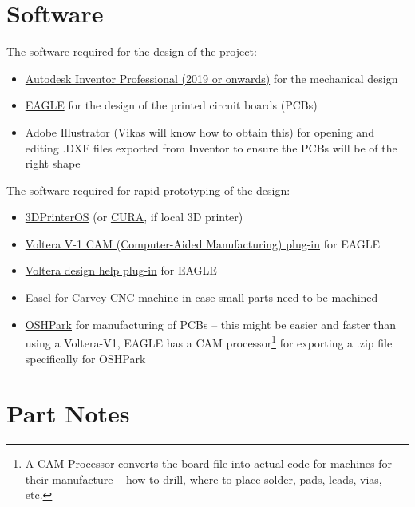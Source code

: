 \documentclass[12pt]{article}
\begin{document}
\section{Software}
The software required for the design of the project:
\begin{itemize}
	\item \href{https://www.autodesk.com/education/free-software/featured}{Autodesk Inventor Professional (2019 or onwards)} for the mechanical design
	\item \href{https://www.autodesk.com/education/free-software/featured}{EAGLE} for the design of the printed circuit boards (PCBs)
	\item Adobe Illustrator (Vikas will know how to obtain this) for opening and editing .DXF files exported from Inventor to ensure the PCBs will be of the right shape
\end{itemize}

The software required for rapid prototyping of the design:
\begin{itemize}
	\item \href{www.3dprinteros.com}{3DPrinterOS} (or \href{https://ultimaker.com/en/products/ultimaker-cura-software}{CURA}, if local 3D printer)
	\item \href{https://support.voltera.io/hc/en-us/articles/115002633033-EAGLE-Export-Guide}{Voltera V-1 CAM (Computer-Aided Manufacturing) plug-in} for EAGLE
	\item \href{https://support.voltera.io/hc/en-us/articles/115002633033-EAGLE-Export-Guide}{Voltera design help plug-in} for EAGLE
	\item \href{https://www.inventables.com/technologies/easel}{Easel} for Carvey CNC machine in case small parts need to be machined
	\item \href{https://oshpark.com/}{OSHPark} for manufacturing of PCBs -- this might be easier and faster than using a Voltera-V1, EAGLE has a CAM processor\footnote{A CAM Processor converts the board file into actual code for machines for their manufacture -- how to drill, where to place solder, pads, leads, vias, etc.} for exporting a .zip file specifically for OSHPark
\end{itemize}

\section{Part Notes}
\end{document}
